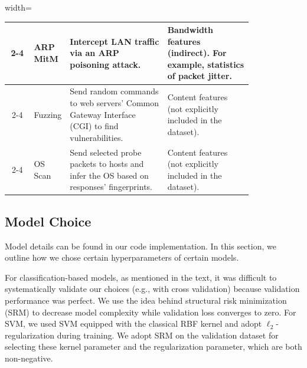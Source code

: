 \documentclass{article}
\begin{document}
\begin{table}[]
\begin{adjustbox}{width=\textwidth}
\begin{tabular}{c| >{\centering\arraybackslash}m{0.07\linewidth}|m{0.4\linewidth}|m{0.35\linewidth}}
        \cline{2-4}
         & ARP MitM &Intercept LAN traffic via an ARP poisoning attack. & Bandwidth features (indirect). For example, statistics of packet jitter.\\
        \cline{2-4}
         & Fuzzing &Send random commands to web servers' Common Gateway Interface (CGI) to find vulnerabilities. & Content features (not explicitly included in the dataset). \\
        \cline{2-4}
         & OS Scan &Send selected probe packets to hosts and infer the OS based on responses' fingerprints. &Content features (not explicitly included in the dataset).  \\
         \bottomrule
    \end{tabular}
    \end{adjustbox}
    \label{tab:attack_summary}
\end{table}




\subsection{Model Choice}
\label{appendix:model_choice}
Model details can be found in our code implementation.
In this section, we outline how we chose certain hyperparameters of certain models.

For classification-based models, as mentioned in the text, it was difficult to systematically validate our choices (e.g., with cross validation) because validation performance was perfect.
We use the idea behind structural risk minimization (SRM) to decrease model complexity while validation loss converges to zero. 
For SVM, we used SVM equipped with the classical RBF kernel and adopt $\ell_2$-regularization during training. We adopt SRM on the validation dataset for selecting
these kernel parameter and the regularization parameter, which are both non-negative.
\end{document}
